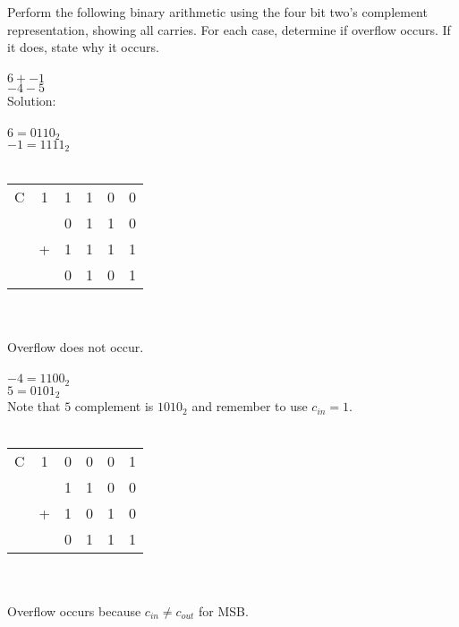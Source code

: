 Perform the following binary arithmetic using the four bit two's complement representation, showing all carries.  For each case, determine if overflow occurs. If it does, state why it occurs.
\\
\\
$6 + -1$\\
$-4 - 5$\\

Solution: \\
\\
$6 = 0110_2$\\
$-1 = 1111_2$\\
\\
\begin{tabular}{cccccc}
  C & 1 & 1 & 1 & 0 & 0 \\
    &   & 0 & 1 & 1 & 0 \\
    & + & 1 & 1 & 1 & 1 \\
  \hline
    &   & 0 & 1 & 0 & 1 \\
\end{tabular} \\
\\
Overflow does not occur.\\
\\
$-4 = 1100_2$\\
$5 = 0101_2$\\
Note that $5$ complement is $1010_2$ and remember to use $c_{in}=1$.\\
\\
\begin{tabular}{cccccc}
  C & 1 & 0 & 0 & 0 & 1 \\
    &   & 1 & 1 & 0 & 0 \\
    & + & 1 & 0 & 1 & 0 \\
  \hline
    &   & 0 & 1 & 1 & 1 \\
\end{tabular} \\
\\
Overflow occurs because $c_{in} \neq c_{out}$ for MSB.\\
